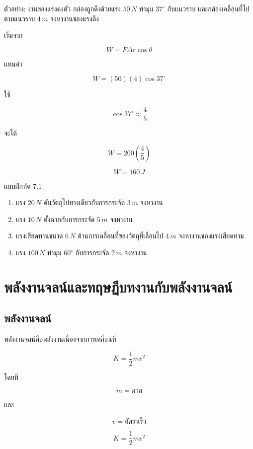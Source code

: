 \begin{examplebox}{ตัวอย่าง: งานของแรงคงตัว}
กล่องถูกดึงด้วยแรง $50\,\si{N}$ ทำมุม $37^\circ$ กับแนวราบ และกล่องเคลื่อนที่ไปตามแนวราบ $4\,\si{m}$ จงหางานของแรงดึง

เริ่มจาก

\[
W=F\Delta r\cos\theta
\]

แทนค่า

\[
W=(50)(4)\cos37^\circ
\]

ใช้

\[
\cos37^\circ\approx \frac{4}{5}
\]

จะได้

\[
W=200\left(\frac{4}{5}\right)
\]

\[
W=160\,\si{J}
\]
\end{examplebox}

\begin{exercisebox}{แบบฝึกหัด 7.1}
\begin{enumerate}
    \item แรง $20\,\si{N}$ ดันวัตถุไปทางเดียวกับการกระจัด $3\,\si{m}$ จงหางาน
    \item แรง $10\,\si{N}$ ตั้งฉากกับการกระจัด $5\,\si{m}$ จงหางาน
    \item แรงเสียดทานขนาด $6\,\si{N}$ ต้านการเคลื่อนที่ของวัตถุที่เลื่อนไป $4\,\si{m}$ จงหางานของแรงเสียดทาน
    \item แรง $100\,\si{N}$ ทำมุม $60^\circ$ กับการกระจัด $2\,\si{m}$ จงหางาน
\end{enumerate}
\end{exercisebox}

\section{พลังงานจลน์และทฤษฎีบทงานกับพลังงานจลน์}

\subsection{พลังงานจลน์}

พลังงานจลน์คือพลังงานเนื่องจากการเคลื่อนที่

\[
K=\frac{1}{2}mv^2
\]

โดยที่

\[
m=\text{มวล}
\]

และ

\[
v=\text{อัตราเร็ว}
\]

\begin{tcolorbox}[title=พลังงานจลน์]
\[
K=\frac{1}{2}mv^2
\]
\end{tcolorbox}

